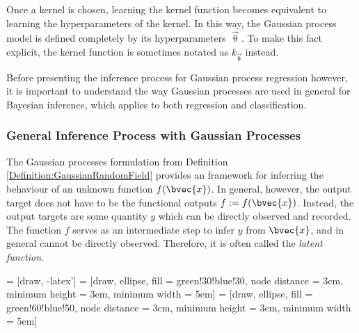 			Once a kernel is chosen, learning the kernel function becomes equivalent to learning the hyperparameters of the kernel. In this way, the Gaussian process model is defined completely by its hyperparameters $\vec{\uptheta}$. To make this fact explicit, the kernel function is sometimes notated as $k_{\vec{\uptheta}}$ instead. %
			
			Before presenting the inference process for Gaussian process regression however, it is important to understand the way Gaussian processes are used in general for Bayesian inference, which applies to both regression and classification.
			
			\subsubsection{General Inference Process with Gaussian Processes}
			\label{Background:GaussianProcesses:Regression:GeneralGaussianProcessInferece}
			
				The Gaussian processes formulation from Definition \ref{Definition:GaussianRandomField} provides an framework for inferring the behaviour of an unknown function $f(\bvec{x})$. In general, however, the output target does not have to be the functional outputs $f := f(\bvec{x})$. Instead, the output targets are some quantity $y$ which can be directly observed and recorded. The function $f$ serves as an intermediate step to infer $y$ from $\bvec{x}$, and in general cannot be directly observed. Therefore, it is often called the \textit{latent function}.
				
				 = [draw, -latex']
				 = [draw, ellipse, fill = green!30!blue!30, node distance = 3cm, minimum height = 3em,  minimum width = 5em]
				 = [draw, ellipse, fill = green!60!blue!50, node distance = 3cm, minimum height = 3em,  minimum width = 5em]
				
